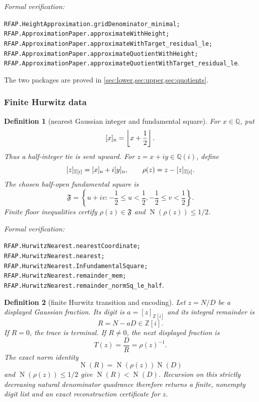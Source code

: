\documentclass[11pt]{article}
\newtheorem{definition}[definition]{Definition}
\newcommand{\Qi}{\mathbb{Q}(i)}
\newcommand{\Zi}{\mathbb{Z}[i]}
\newcommand{\Q}{\mathbb{Q}}
\newcommand{\Norm}[1]{\operatorname{N}\!\left(#1\right)}
\newcommand{\leanref}[1]{\par\smallskip\noindent
  \emph{Formal verification:}\par\nobreak
  {\raggedright\nolinkurl{#1}.\par}}
\begin{document}
\leanref{RFAP.HeightApproximation.gridDenominator_minimal;
RFAP.ApproximationPaper.approximateWithHeight;
RFAP.ApproximationPaper.approximateWithTarget_residual_le;
RFAP.ApproximationPaper.approximateQuotientWithHeight;
RFAP.ApproximationPaper.approximateQuotientWithTarget_residual_le}

The two packages are proved in
\cref{sec:lower,sec:upper,sec:quotients}.

\subsubsection{Finite Hurwitz data}

\begin{definition}[nearest Gaussian integer and fundamental square]
\label{def:nearest-gaussian}
For $x\in\Q$, put
\[
                  [x]_{\rm n}=\left\lfloor x+\frac12\right\rfloor.
\]
Thus a half-integer tie is sent upward.  For $z=x+iy\in\Qi$, define
\[
 [z]_{\Zi}=[x]_{\rm n}+i[y]_{\rm n},
 \qquad
 \rho(z)=z-[z]_{\Zi}.
\]
The chosen half-open fundamental square is
\begin{equation}
\label{eq:fundamental-square}
 \mathfrak F=
 \left\{u+iv:-\frac12\le u<\frac12,
                  -\frac12\le v<\frac12\right\}.
\end{equation}
Finite floor inequalities certify $\rho(z)\in\mathfrak F$ and
$\Norm{\rho(z)}\le1/2$.
\end{definition}

\leanref{RFAP.HurwitzNearest.nearestCoordinate;
RFAP.HurwitzNearest.nearest;
RFAP.HurwitzNearest.InFundamentalSquare;
RFAP.HurwitzNearest.remainder_mem;
RFAP.HurwitzNearest.remainder_normSq_le_half}

\begin{definition}[finite Hurwitz transition and encoding]
\label{def:finite-hurwitz-transition}
Let $z=N/D$ be a displayed Gaussian fraction.  Its digit is
$a=[z]_{\Zi}$ and its integral remainder is
\[
                           R=N-aD\in\Zi.
\]
If $R=0$, the trace is terminal.  If $R\ne0$, the next displayed fraction is
\[
                         T(z)=\frac{D}{R}
                             =\rho(z)^{-1}.
\]
The exact norm identity
\[
                   \Norm R=\Norm{\rho(z)}\Norm D
\]
and $\Norm{\rho(z)}\le1/2$ give $\Norm R<\Norm D$.  Recursion on this
strictly decreasing natural denominator quadrance therefore returns a finite,
nonempty digit list and an exact reconstruction certificate for $z$.
\end{definition}
\end{document}
